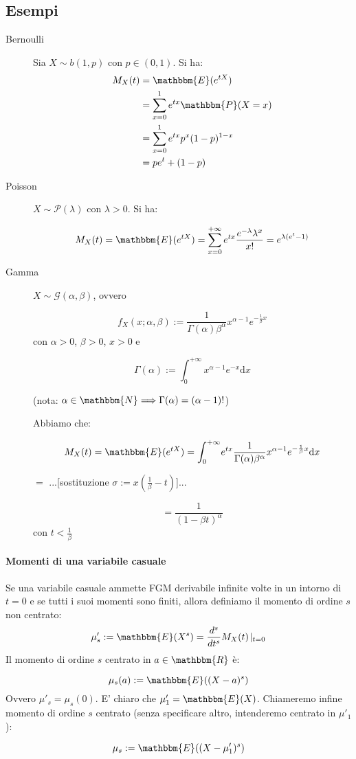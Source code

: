\subsection{Esempi}
\begin{description}
\item[Bernoulli] Sia \(X \sim b(1,p)\) con \(p \in (0,1)\). Si ha:
\begin{align*}
M_X (t) &= \mathbbm{E}(e^{tX}) \\ 
			&= \displaystyle\sum_{x=0}^1 e^{tx} \mathbbm{P}(X=x) \\
			&= \displaystyle\sum_{x=0}^1 e^{tx} p^x (1-p)^{1-x} \\
			&= p e^t + (1-p)
\end{align*}	


\item[Poisson] $X \sim \mathcal{P} (\lambda)$ con $\lambda > 0$. Si ha:

$$M_X (t) 	= \mathbbm{E}(e^{tX}) 
			= \displaystyle\sum_{x=0}^{+\infty} e^{tx} \frac{e^{-\lambda} \lambda^x}{x!}
			= e^{\lambda (e^t -1)}$$
			
			
\item[Gamma] $X \sim \mathcal{G} (\alpha, \beta)$, ovvero 

$$f_X (x; \alpha, \beta) := \frac{1}{\Gamma (\alpha) \beta^{\alpha}} x^{\alpha -1} e^{-\frac{1}{\beta} x}$$ con $\alpha>0$, $\beta>0$, $x>0$ e 

$$\Gamma(\alpha) := \int_0^{+\infty} \! x^{\alpha -1} e^{-x} \mathrm{d}x$$ 

(nota: $\alpha \in \mathbbm{N} \Longrightarrow \Gamma(\alpha)=(\alpha - 1)!$)

Abbiamo che: 

$$M_X (t)	= \mathbbm{E}(e^{tX})
			= \int_0^{+\infty} \! e^{tx} \frac{1}{\Gamma (\alpha) \beta^{\alpha}} x^{\alpha -1} e^{-\frac{1}{\beta} x} \mathrm{d}x$$
\begin{center} $=$ ...[sostituzione $\sigma := x(\frac{1}{\beta} - t)$]...  \end{center}
			$$= \frac{1}{(1-\beta t)^{\alpha}}$$ con $t < \frac{1}{\beta}$
			
\end{description}

\paragraph{Momenti di una variabile casuale}

\begin{definizione}
Se una variabile casuale ammette FGM derivabile infinite volte in un intorno di $t=0$ e se tutti i suoi momenti sono finiti, allora definiamo il momento di ordine $s$ non centrato: 
$$\mu'_s := \mathbbm{E} (X^s) = \frac{d^s}{dt^s} M_X (t) \! \mid_{t=0}$$ 
Il momento di ordine $s$ centrato in $a \in \mathbbm{R}$ è: 

$$\mu_s (a) := \mathbbm{E} ((X-a)^s)$$
Ovvero $\mu'_s = \mu_s (0)$. E' chiaro che $\mu'_1 = \mathbbm{E} (X)$.
Chiameremo infine momento di ordine $s$ centrato (senza specificare altro, intenderemo centrato in $\mu'_1$):

$$\mu_s := \mathbbm{E} ((X-\mu'_1)^s)$$
\end{definizione}

